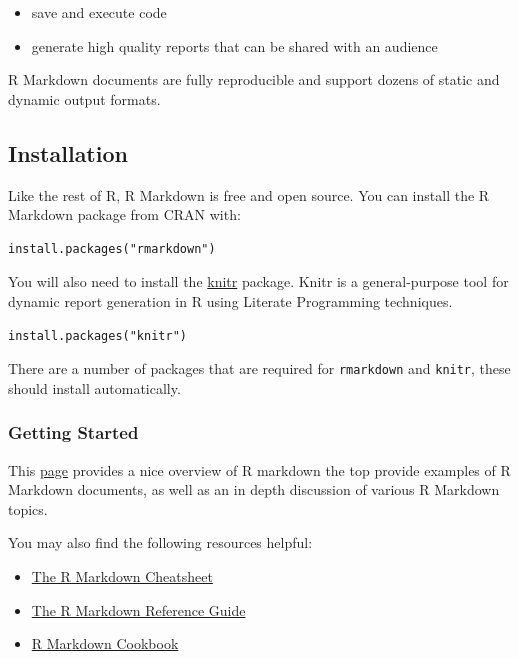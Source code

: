 \documentclass[
]{article}
\begin{document}
\begin{itemize}
\item
  save and execute code
\item
  generate high quality reports that can be shared with an audience
\end{itemize}

R Markdown documents are fully reproducible and support dozens of static
and dynamic output formats.

\hypertarget{installation}{%
\subsection{Installation}\label{installation}}

Like the rest of R, R Markdown is free and open source. You can install
the R Markdown package from CRAN with:

\begin{verbatim}
install.packages("rmarkdown")
\end{verbatim}

You will also need to install the \href{http://yihui.name/knitr/}{knitr}
package. Knitr is a general-purpose tool for dynamic report generation
in R using Literate Programming techniques.

\begin{verbatim}
install.packages("knitr")
\end{verbatim}

There are a number of packages that are required for \texttt{rmarkdown}
and \texttt{knitr}, these should install automatically.

\hypertarget{getting-started}{%
\subsubsection{Getting Started}\label{getting-started}}

This \href{https://rmarkdown.rstudio.com/lesson-1.html}{page} provides a
nice overview of R markdown the top provide examples of R Markdown
documents, as well as an in depth discussion of various R Markdown
topics.

You may also find the following resources helpful:

\begin{itemize}
\item
  \href{https://github.com/rstudio/cheatsheets/raw/main/rmarkdown-2.0.pdf}{The
  R Markdown Cheatsheet}
\item
  \href{https://www.rstudio.com/wp-content/uploads/2015/03/rmarkdown-reference.pdf}{The
  R Markdown Reference Guide}
\item
  \href{https://bookdown.org/yihui/rmarkdown-cookbook/}{R Markdown
  Cookbook}
\end{itemize}
\end{document}
